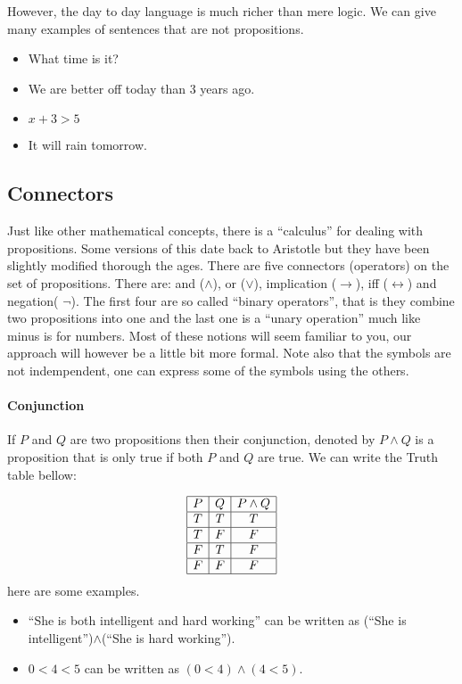 However, the day to day language is much richer than mere logic. We can give  many examples of sentences that are not propositions. 

\begin{itemize}

\item What time is it?
\item  We are better off today than 3 years ago.
\item $x+3>5$
\item It will rain tomorrow.

\end{itemize}

  \subsection{Connectors}
Just like other mathematical concepts, there is a ``calculus'' for dealing with  propositions. Some versions of this date back to Aristotle but they have been slightly modified thorough the ages. There are five connectors (operators) on the set of propositions. There are: and ($\land$), or ($\lor$),  implication ($\rightarrow$),   iff ($\leftrightarrow$) and  negation( $\neg$). The first four are so called ``binary operators'', that is they combine two propositions into one and the last one is a ``unary operation''  much like minus is for numbers. Most of these notions will seem familiar to you, our approach will however be a little bit more formal. Note also that the symbols are not indempendent, one can express some of the symbols using the others.

\paragraph{\bf Conjunction}
If $P$ and $Q$ are two propositions then their conjunction, denoted by $P\land Q$ is a proposition that is only true if both $P$ and $Q$ are true. We can write the Truth table bellow:

$$\begin{array}{|c|c|c|}\hline P & Q & P\land Q \\\hline T & T & T \\\hline T & F & F \\\hline F & T & F \\\hline F & F & F\\ \hline\end{array}$$
here are some examples.

\begin{itemize}
\item ``She is both intelligent and hard working'' can be written as (``She is intelligent'')$\land$(``She is hard working'').
\item $0<4<5$ can be written as $(0<4)\land (4<5)$.
\end{itemize}

